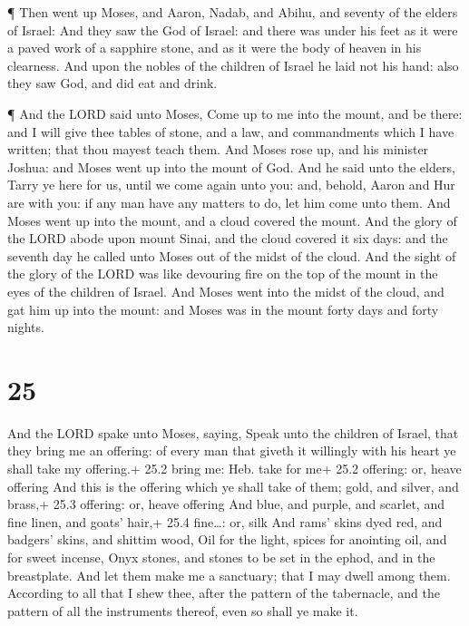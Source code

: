  ¶ Then went up Moses, and Aaron, Nadab, and Abihu, and
seventy of the elders of Israel:  And they saw the God of
Israel: and there was under his feet as it were a paved work of a
sapphire stone, and as it were the body of heaven in his clearness.
 And upon the nobles of the children of Israel he laid not
his hand: also they saw God, and did eat and drink.

 ¶ And the LORD said unto Moses, Come up to me into the
mount, and be there: and I will give thee tables of stone, and a law,
and commandments which I have written; that thou mayest teach them.
 And Moses rose up, and his minister Joshua: and Moses went
up into the mount of God.  And he said unto the elders,
Tarry ye here for us, until we come again unto you: and, behold, Aaron
and Hur are with you: if any man have any matters to do, let him come
unto them.  And Moses went up into the mount, and a cloud
covered the mount.  And the glory of the LORD abode upon
mount Sinai, and the cloud covered it six days: and the seventh day he
called unto Moses out of the midst of the cloud.  And the
sight of the glory of the LORD was like devouring fire on the top of the
mount in the eyes of the children of Israel.  And Moses
went into the midst of the cloud, and gat him up into the mount: and
Moses was in the mount forty days and forty nights.

\hypertarget{section-24}{%
\section{25}\label{section-24}}

 And the LORD spake unto Moses, saying,  Speak
unto the children of Israel, that they bring me an offering: of every
man that giveth it willingly with his heart ye shall take my offering.+
25.2 bring me: Heb. take for me+ 25.2 offering: or, heave offering
 And this is the offering which ye shall take of them; gold,
and silver, and brass,+ 25.3 offering: or, heave offering 
And blue, and purple, and scarlet, and fine linen, and goats' hair,+
25.4 fine\ldots: or, silk  And rams' skins dyed red, and
badgers' skins, and shittim wood,  Oil for the light, spices
for anointing oil, and for sweet incense,  Onyx stones, and
stones to be set in the ephod, and in the breastplate.  And
let them make me a sanctuary; that I may dwell among them. 
According to all that I shew thee, after the pattern of the tabernacle,
and the pattern of all the instruments thereof, even so shall ye make
it.

